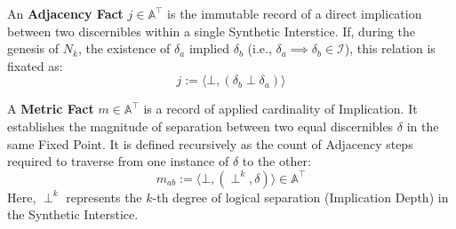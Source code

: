 
\begin{formalism}  %
    An \textbf{Adjacency Fact} $j \in \mathbb{A}^\top$ is the immutable
    record of a direct implication between two discernibles within a single
    Synthetic Interstice. If, during the genesis of $N_k$, the existence of
    $\delta_a$ implied $\delta_b$ (i.e., $\delta_a \implies \delta_b \in
    \mathcal{I}$), this relation is fixated as:
    \begin{equation}
        j := \langle \bot, (\delta_b \perp \delta_a) \rangle
    \end{equation}
\end{formalism}


\begin{formalism}  %
    A \textbf{Metric Fact} $m \in \mathbb{A}^\top$ is a record of applied
    cardinality of Implication. It establishes the magnitude of separation
    between two equal discernibles $\delta$ in the same Fixed Point. It is
    defined recursively as the count of Adjacency steps required to traverse
    from one instance of $\delta$ to the other:
    \begin{equation}
        m_{ab} := \langle \bot, (\perp^k, \delta) \rangle \in \mathbb{A}^\top
    \end{equation}
    Here, $\perp^k$ represents the $k$-th degree of logical separation
    (Implication Depth) in the Synthetic Interstice.
\end{formalism}


